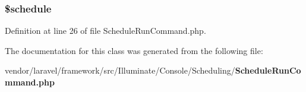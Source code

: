 \subsubsection[{\$schedule}]{\setlength{\rightskip}{0pt plus 5cm}\$schedule\hspace{0.3cm}{\ttfamily [protected]}}\label{class_illuminate_1_1_console_1_1_scheduling_1_1_schedule_run_command_ab5dd2f4095f936782d11344a4293c3dd}


Definition at line 26 of file Schedule\+Run\+Command.\+php.



The documentation for this class was generated from the following file\+:\begin{DoxyCompactItemize}
\item 
vendor/laravel/framework/src/\+Illuminate/\+Console/\+Scheduling/{\bf Schedule\+Run\+Command.\+php}\end{DoxyCompactItemize}
